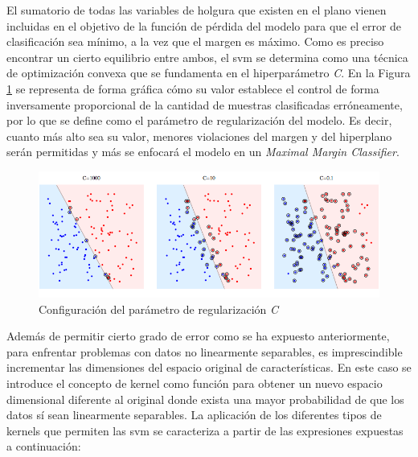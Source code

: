 \pagebreak

El sumatorio de todas las variables de holgura que existen en el plano vienen incluidas en el objetivo de la función de pérdida del modelo para que el error de clasificación sea mínimo, a la vez que el margen es máximo. Como es preciso encontrar un cierto equilibrio entre ambos, el \gls{svm} se determina como una técnica de optimización convexa que se fundamenta en el hiperparámetro \textit{C}. En la Figura \ref{fig:parametroc} se representa de forma gráfica cómo su valor establece el control de forma inversamente proporcional de la cantidad de muestras clasificadas erróneamente, por lo que se define como el parámetro de regularización del modelo. Es decir, cuanto más alto sea su valor, menores violaciones del margen y del hiperplano serán permitidas y más se enfocará el modelo en un \textit{Maximal Margin Classifier}.~\cite{svmciencia}

\vspace{3mm}

\begin{figure}[h!]
    \centering
    \includegraphics[width=1\textwidth]{img/teoria/parametroc.png}
    \caption{Configuración del parámetro de regularización \textit{C} \cite{velocity}}
    \label{fig:parametroc}
\end{figure}

\vspace{3mm}

Además de permitir cierto grado de error como se ha expuesto anteriormente, para enfrentar problemas con datos no linearmente separables, es imprescindible incrementar las dimensiones del espacio original de características. En este caso se introduce el concepto de kernel como función para obtener un nuevo espacio dimensional diferente al original donde exista una mayor probabilidad de que los datos sí sean linearmente separables. La aplicación de los diferentes tipos de kernels que permiten las \gls{svm} se caracteriza a partir de las expresiones expuestas a continuación:~\cite{svmciencia}~\cite{velocity}

